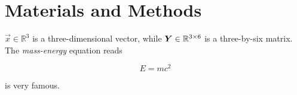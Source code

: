 
\section{Materials and Methods \label{sec:materials-and-methods}}
    \(\vec{x}\in\mathbb{R}^3\) is a three-dimensional vector, while \(\mat{Y}\in\mathbb{R}^{3\times 6}\) is a three-by-six matrix. 
    The \emph{mass-energy} equation reads
    
    \begin{equation}
        \label{eq:mass-energy-equivalence}
	    E = m c^2
    \end{equation}

     is very famous.